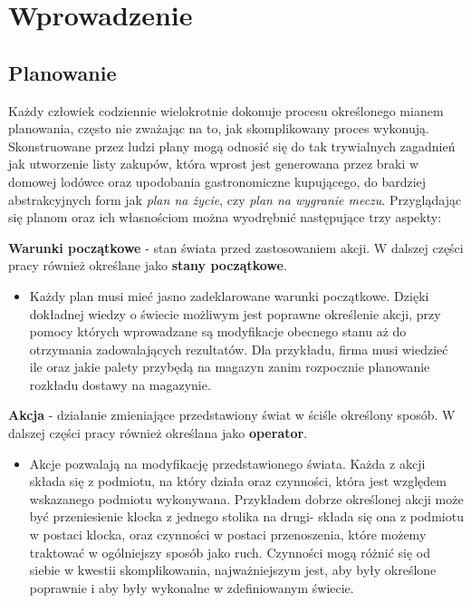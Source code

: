 \chapter{Wprowadzenie}
\thispagestyle{chapterBeginStyle}
\label{rozdzial1}
\section{Planowanie}

    Każdy człowiek codziennie wielokrotnie dokonuje procesu określonego mianem planowania, często nie zważając na to, jak skomplikowany proces wykonują.
    Skonstruowane przez ludzi plany mogą odnosić się do tak trywialnych zagadnień jak utworzenie listy zakupów, która wprost jest generowana przez braki
    w domowej lodówce oraz upodobania gastronomiczne kupującego, do bardziej abstrakcyjnych form jak \textit{plan na życie}, czy \textit{plan na wygranie meczu}.
    Przyglądając się planom oraz ich własnościom można wyodrębnić następujące trzy aspekty:
    \begin{definition}
    \label{StanyPoczatkowe}
        \textbf{Warunki początkowe} - stan świata przed zastosowaniem akcji. W dalszej części pracy również określane jako 
        \textbf{stany początkowe}.
    \end{definition}
    \begin{itemize}
        \item Każdy plan musi mieć jasno zadeklarowane warunki początkowe.
        Dzięki dokładnej wiedzy o świecie możliwym jest poprawne określenie akcji, przy pomocy których wprowadzane są modyfikacje
        obecnego stanu aż do otrzymania zadowalających rezultatów. Dla przykładu, firma musi wiedzieć ile oraz jakie palety 
        przybędą na magazyn zanim rozpocznie planowanie rozkładu dostawy na magazynie.
    \end{itemize}
    \begin{definition}
    \label{Akcje}
        \textbf{Akcja} - działanie zmieniające przedstawiony świat w ściśle określony sposób. W dalszej części pracy również określana jako
        \textbf{operator}.
    \end{definition}
    \begin{itemize}
        \item Akcje pozwalają na modyfikację przedstawionego świata. Każda z akcji składa się z podmiotu, na który działa oraz czynności,
        która jest względem wskazanego podmiotu wykonywana. Przykładem dobrze określonej akcji może być przeniesienie klocka z 
        jednego stolika na drugi- składa się ona z podmiotu w postaci klocka, oraz czynności w postaci przenoszenia, które możemy traktować
        w ogólniejszy sposób jako ruch. Czynności mogą różnić się od siebie w kwestii skomplikowania, najważniejszym jest, aby były określone poprawnie i aby były wykonalne w zdefiniowanym świecie.
    \end{itemize}
